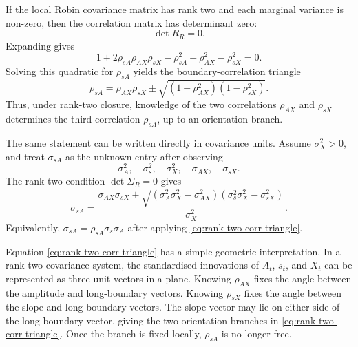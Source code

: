 \documentclass[11pt]{article}
\numberwithin{equation}{section}
\begin{document}
If the local Robin covariance matrix has rank two and each marginal variance is non-zero, then the correlation matrix has determinant zero:
\begin{equation}
\label{eq:rank-two-corr-det-zero}
        \det R_R=0.
\end{equation}
Expanding gives
\begin{equation}
\label{eq:rank-two-corr-det-expanded}
        1+2\rho_{sA}\rho_{AX}\rho_{sX}
        -\rho_{sA}^2-\rho_{AX}^2-\rho_{sX}^2=0.
\end{equation}
Solving this quadratic for \(\rho_{sA}\) yields the boundary-correlation triangle
\begin{equation}
\label{eq:rank-two-corr-triangle}
\boxed{
        \rho_{sA}
        =
        \rho_{AX}\rho_{sX}
        \pm
        \sqrt{(1-\rho_{AX}^2)(1-\rho_{sX}^2)}.
}
\end{equation}
Thus, under rank-two closure, knowledge of the two correlations \(\rho_{AX}\) and \(\rho_{sX}\) determines the third correlation \(\rho_{sA}\), up to an orientation branch.

The same statement can be written directly in covariance units.  Assume \(\sigma_X^2>0\), and treat \(\sigma_{sA}\) as the unknown entry after observing
\[
        \sigma_A^2,
        \quad \sigma_s^2,
        \quad \sigma_X^2,
        \quad \sigma_{AX},
        \quad \sigma_{sX}.
\]
The rank-two condition \(\det\Sigma_R=0\) gives
\begin{equation}
\label{eq:rank-two-sigma-sA-branches}
\boxed{
        \sigma_{sA}
        =
        \frac{
        \sigma_{AX}\sigma_{sX}
        \pm
        \sqrt{
        (\sigma_A^2\sigma_X^2-\sigma_{AX}^2)
        (\sigma_s^2\sigma_X^2-\sigma_{sX}^2)
        }}{
        \sigma_X^2
        }.
}
\end{equation}
Equivalently, \(\sigma_{sA}=\rho_{sA}\sigma_s\sigma_A\) after applying \eqref{eq:rank-two-corr-triangle}.

Equation \eqref{eq:rank-two-corr-triangle} has a simple geometric interpretation.  In a rank-two covariance system, the standardised innovations of \(A_t\), \(s_t\), and \(X_t\) can be represented as three unit vectors in a plane.  Knowing \(\rho_{AX}\) fixes the angle between the amplitude and long-boundary vectors.  Knowing \(\rho_{sX}\) fixes the angle between the slope and long-boundary vectors.  The slope vector may lie on either side of the long-boundary vector, giving the two orientation branches in \eqref{eq:rank-two-corr-triangle}.  Once the branch is fixed locally, \(\rho_{sA}\) is no longer free.
\end{document}
